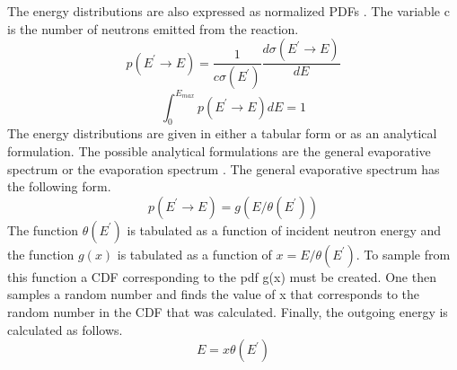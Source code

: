 The energy distributions are also expressed as normalized PDFs 
\citep{chadwick_endf/b-vii.1_2011}. The variable c is the number of neutrons
emitted from the reaction.
\begin{equation}
  p(E^{'} \to E) = \frac{1}{c\sigma(E^{'})}\frac{d\sigma(E^{'} \to E)}{dE}
\end{equation}
\begin{equation}
  \int_0^{E_{max}}p(E^{'} \to E)dE = 1
\end{equation}
The energy distributions are given in either a tabular form or as an analytical
formulation. The possible analytical formulations are the general evaporative
spectrum or the evaporation spectrum \citep{chadwick_endf/b-vii.1_2011}. The 
general evaporative spectrum has the following form.
\begin{equation}
  p(E^{'} \to E) = g(E/\theta(E^{'}))
\end{equation}
The function $\theta(E^{'})$ is tabulated as a function of incident neutron 
energy and the function $g(x)$ is tabulated as a function of 
$x = E/\theta(E^{'})$. To sample from this function a CDF corresponding to 
the pdf g(x) must be created. One then samples a random number and finds the
value of x that corresponds to the random number in the CDF that was 
calculated. Finally, the outgoing energy is calculated as follows.
\begin{equation}
  E = x\theta(E^{'})
\end{equation}

